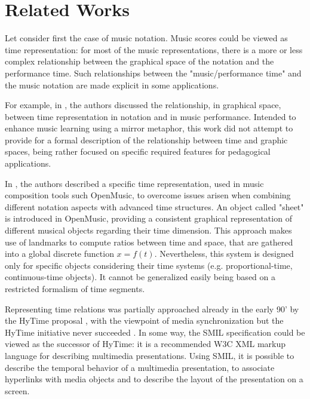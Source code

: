\documentclass[letterpaper, 12pt]{article}
\begin{document}
\section{Related Works}
Let consider first the case of music notation. Music scores could be viewed as time representation: for most of the music representations, there is a more or less complex relationship between the graphical space of the notation and the performance time. Such relationships between the "music/performance time" and the music notation are made explicit in some applications.  

For example, in \cite{Fober:07b}, the authors discussed the relationship, in graphical space, between time representation in notation and in music performance. Intended to enhance music learning using a mirror metaphor, this work did not attempt to provide for a formal description of the relationship between time and graphic spaces,  being rather focused on specific required features for pedagogical applications. 

In \cite{bresson08}, the authors described a specific time representation, used in music composition tools such OpenMusic, to overcome issues arisen when combining different notation aspects with advanced time structures. An object called "sheet" is introduced in OpenMusic, providing a consistent graphical representation of different musical objects regarding their time dimension. This approach makes use of landmarks to compute ratios between time and space, that are gathered into a global discrete function $x=f(t)$. Nevertheless, this system is designed only for specific objects considering their time systems (e.g. proportional-time, continuous-time objects). It  cannot be generalized easily being based on a restricted formalism of time segments.




Representing time relations was partially approached already in the early 90' by the HyTime proposal \cite{hytime91}, with the viewpoint of media synchronization but the HyTime initiative never succeeded \cite{sloan02}.
In some way, the SMIL specification \cite{hoschka98} could be viewed as the successor of HyTime: it is a recommended W3C XML markup language for describing multimedia presentations. Using SMIL, it is possible to describe the temporal behavior of a multimedia presentation, to associate hyperlinks with media objects and to describe the layout of the presentation on a screen.
\end{document}
